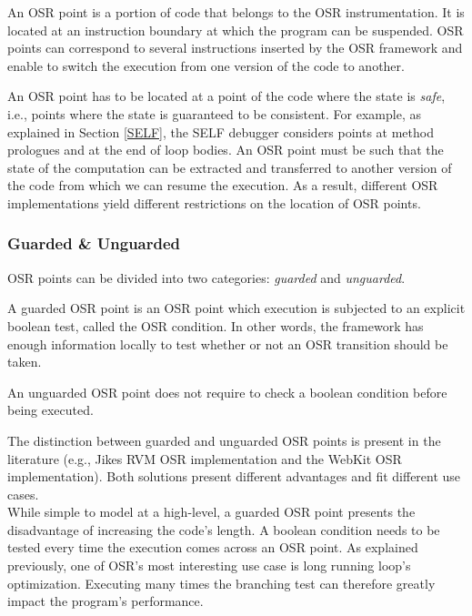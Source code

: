 \begin{definition}\label{OSRPointDefinition}
An OSR point is a portion of code that belongs to the OSR instrumentation.
It is located at an instruction boundary at which the program can be suspended.
OSR points can correspond to several instructions inserted by the OSR framework and enable to switch the execution from one version of the code to another.
\end{definition}

An OSR point has to be located at a point of the code where the state is \textit{safe}, i.e., points where the state is guaranteed to be consistent.
For example, as explained in Section \ref{SELF}, the SELF debugger\cite{holzle1992debugging} considers points at method prologues and at the end of loop bodies.
An OSR point must be such that the state of the computation can be extracted and transferred to another version of the code from which we can resume the execution.
As a result, different OSR implementations yield different restrictions on the location of OSR points.\\

\subsubsection{Guarded \& Unguarded}

OSR points can be divided into two categories: \textit{guarded} and \textit{unguarded}.
\begin{definition}
A guarded OSR point is an OSR point which execution is subjected to an explicit boolean test, called the OSR condition.
In other words, the framework has enough information locally to test whether or not an OSR transition should be taken.
\end{definition}
\begin{definition}
An unguarded OSR point does not require to check a boolean condition before being executed. 
\end{definition}
The distinction between guarded and unguarded OSR points is present in the literature (e.g., Jikes RVM OSR implementation\cite{fink2003design, soman2006efficient} and the WebKit OSR implementation\cite{WebKitURL}).
Both solutions present different advantages and fit different use cases.\\

While simple to model at a high-level, a guarded OSR point presents the disadvantage of increasing the code's length. 
A boolean condition needs to be tested every time the execution comes across an OSR point.
As explained previously, one of OSR's most interesting use case is long running loop's optimization.
Executing many times the branching test can therefore greatly impact the program's performance.\\

